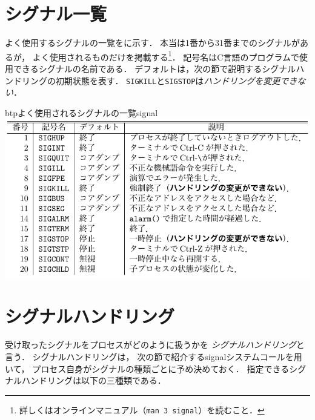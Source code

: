 \section{シグナル一覧}
よく使用するシグナルの一覧をに示す．
本当は1番から31番までのシグナルがあるが，
よく使用されるものだけを掲載する\footnote{
詳しくはオンラインマニュアル（\texttt{man 3 signal}）を読むこと．}．
記号名はC言語のプログラムで使用できるシグナルの名前である．
デフォルトは，次の節で説明するシグナルハンドリングの初期状態を表す．
\texttt{SIGKILL}と\texttt{SIGSTOP}は\emph{ハンドリングを変更できない}．

\begin{mytable}{btp}{よく使用されるシグナルの一覧}{signal}
  \includegraphics[scale=1.0]{Tbl/signal.pdf}
\end{mytable}

\section{シグナルハンドリング}
受け取ったシグナルをプロセスがどのように扱うかを
\emph{シグナルハンドリング}と言う．
シグナルハンドリングは，
次の節で紹介するsignalシステムコールを用いて，
プロセス自身がシグナルの種類ごとに予め決めておく．
指定できるシグナルハンドリングは以下の三種類である．

